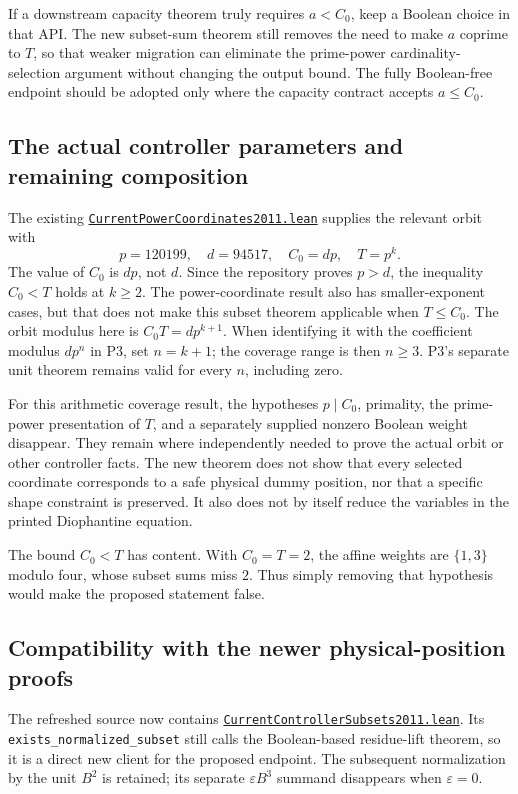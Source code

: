 \documentclass[11pt,letterpaper]{article}
\newcommand{\repobase}{https://github.com/VladimirReshetnikov/ProveIt/blob/9f35798db4a63c25e435fca14d75931144657d7e}
\newcommand{\refreshbase}{https://github.com/VladimirReshetnikov/ProveIt/blob/f00ba53b331833c6cb64707bd90e48489e5610f5}
\newcommand{\freshleanfile}[1]{\href{\refreshbase/Computability/DiophantineConsistency/Lean/DiophantineConsistency/#1.lean}{\nolinkurl{#1.lean}}}
\newcommand{\leanfile}[1]{\href{\repobase/Computability/DiophantineConsistency/Lean/DiophantineConsistency/#1.lean}{\nolinkurl{#1.lean}}}
\newcommand{\ident}[1]{\nolinkurl{#1}}
\begin{document}
If a downstream capacity theorem truly requires $a<C_0$, keep a Boolean
choice in that API. The new subset-sum theorem still removes the need to
make $a$ coprime to $T$, so that weaker migration can eliminate the
prime-power cardinality-selection argument without changing the output
bound. The fully Boolean-free endpoint should be adopted only where the
capacity contract accepts $a\le C_0$.

\subsection{The actual controller parameters and remaining composition}

The existing \leanfile{CurrentPowerCoordinates2011} supplies the relevant
orbit with
\[
 p=120199,\quad d=94517,\quad C_0=dp,\quad T=p^k.
\]
The value of $C_0$ is $dp$, not $d$. Since the repository proves $p>d$,
the inequality $C_0<T$ holds at $k\ge2$. The power-coordinate result also
has smaller-exponent cases, but that does not make this subset theorem
applicable when $T\le C_0$.
The orbit modulus here is $C_0T=dp^{k+1}$. When identifying it with the
coefficient modulus $dp^n$ in P3, set $n=k+1$; the coverage range is then
$n\ge3$. P3's separate unit theorem remains valid for every $n$, including
zero.

For this arithmetic coverage result, the hypotheses $p\mid C_0$, primality,
the prime-power presentation of $T$, and a separately supplied nonzero
Boolean weight disappear. They remain where independently needed to prove
the actual orbit or other controller facts. The new theorem does not show
that every selected coordinate corresponds to a safe physical dummy
position, nor that a specific shape constraint is preserved. It also does
not by itself reduce the variables in the printed Diophantine equation.

The bound $C_0<T$ has content. With $C_0=T=2$, the affine weights are
$\{1,3\}$ modulo four, whose subset sums miss $2$. Thus simply removing
that hypothesis would make the proposed statement false.

\subsection{Compatibility with the newer physical-position proofs}

The refreshed source now contains
\freshleanfile{CurrentControllerSubsets2011}. Its
\ident{exists_normalized_subset} still calls the Boolean-based residue-lift
theorem, so it is a direct new client for the proposed endpoint. The
subsequent normalization by the unit $B^2$ is retained; its separate
$\varepsilon B^3$ summand disappears when $\varepsilon=0$.
\end{document}
